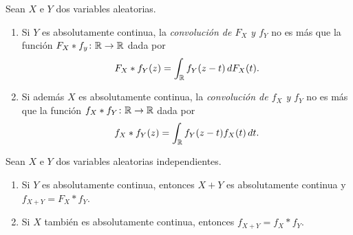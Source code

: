 \documentclass[a4paper, 11pt, extrafontsizes]{memoir}
\begin{document}
\begin{definition}
    Sean $X$ e $Y$ dos variables aleatorias.
    \begin{enumerate}
        \item Si $Y$ es absolutamente continua, la \emph{convolución de $F_X$ y $f_Y$} no es más que la función $F_X \ast f_y \colon \mathbb R \to \mathbb R$ dada por
        \[F_X \ast f_Y(z) = \int_\mathbb R f_Y(z- t) \, dF_X(t).\]
        \item Si además $X$ es absolutamente continua, la \emph{convolución de $f_X$ y $f_Y$} no es más que la función $f_X \ast f_Y \colon \mathbb R \to \mathbb R$ dada por
        \[f_X \ast f_Y(z) = \int_\mathbb R f_Y(z-t)f_X(t) \, dt.\]
    \end{enumerate}
\end{definition}

\begin{proposition}
    Sean $X$ e $Y$ dos variables aleatorias independientes.
    \begin{enumerate}
        \item Si $Y$ es absolutamente continua, entonces $X+Y$ es absolutamente continua y $f_{X+Y} = F_X \ast f_Y$.
        \item Si $X$ también es absolutamente continua, entonces $f_{X+Y}=f_X\ast f_Y$.
    \end{enumerate}
\end{proposition}
\end{document}
